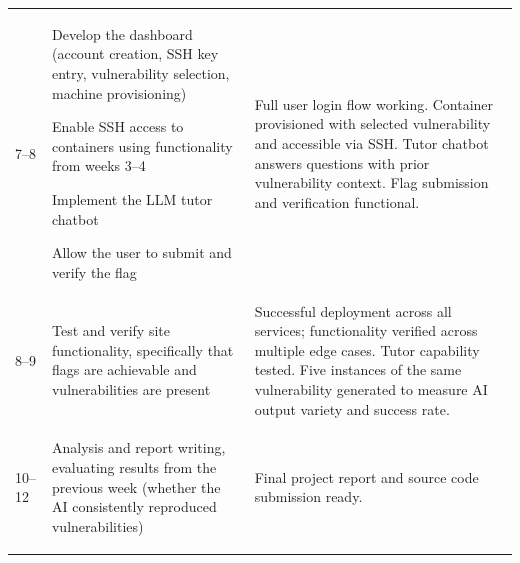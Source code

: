 \documentclass[serif,oneside,single,parskip,raggedright,numeric]{qproposal}
\begin{document}
\begin{longtable}{C{1.3cm} P{6.2cm} P{6.2cm}}
  7--8 &
  \begin{cellist}
    \item Develop the dashboard (account creation, SSH key entry, vulnerability selection, machine provisioning)
    \item Enable SSH access to containers using functionality from weeks 3--4
    \item Implement the LLM tutor chatbot
    \item Allow the user to submit and verify the flag
  \end{cellist}
  &
  Full user login flow working. Container provisioned with selected vulnerability and accessible via SSH. Tutor chatbot answers questions with prior vulnerability context. Flag submission and verification functional.
  \\[4pt]

  8--9 &
  \begin{cellist}
    \item Test and verify site functionality, specifically that flags are achievable and vulnerabilities are present
  \end{cellist}
  &
  Successful deployment across all services; functionality verified across multiple edge cases. Tutor capability tested. Five instances of the same vulnerability generated to measure AI output variety and success rate.
  \\[4pt]

  10--12 &
  \begin{cellist}
    \item Analysis and report writing, evaluating results from the previous week (whether the AI consistently reproduced vulnerabilities)
  \end{cellist}
  &
  Final project report and source code submission ready.
  \\

\end{longtable}

\end{document}
